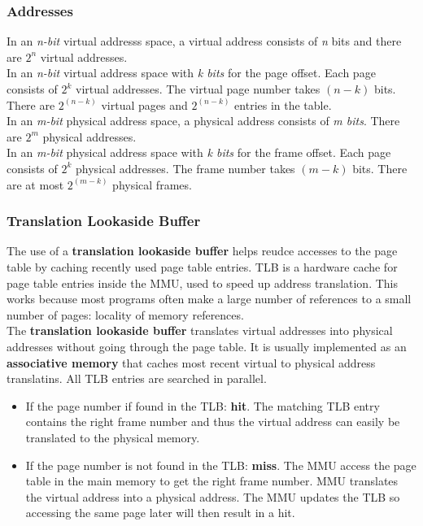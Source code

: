 \documentclass{article}
\newcommand{\bold}[1]{\textbf{#1}}
\renewcommand{\b}{\item[$\circ$]}
\newcommand{\newlist}{\begin{itemize}}
\renewcommand{\endlist}{\end{itemize}}
\begin{document}
\subsubsection{Addresses}

In an \emph{n-bit} virtual addresss space, a virtual address consists of \emph{n} bits and there are $2^n$ virtual addresses. \\ 

In an \emph{n-bit} virtual address space with \emph{k bits} for the page offset. Each page consists of $2^k$ virtual addresses. The virtual page number takes $(n-k)$ bits. There are $2^{(n-k)}$ virtual pages and $2^{(n-k)}$ entries in the table. \\ 

In an \emph{m-bit} physical address space, a physical address consists of \emph{m bits}. There are $2^m$ physical addresses. \\ 

In an \emph{m-bit} physical address space with \emph{k bits} for the frame offset. Each page consists of $2^k$ physical addresses. The frame number takes $(m-k)$ bits. There are at most $2^{(m-k)}$ physical frames. \\ 

\subsubsection{Translation Lookaside Buffer}

The use of a \bold{translation lookaside buffer} helps reudce accesses to the page table by caching recently used page table entries. TLB is a hardware cache for page table entries inside the MMU, used to speed up address translation. This works because most programs often make a large number of references to a small number of pages: locality of memory references. \\ 

The \bold{translation lookaside buffer} translates virtual addresses into physical addresses without going through the page table. It is usually implemented as an \bold{associative memory} that caches most recent virtual to physical address translatins. All TLB entries are searched in parallel. 

\newlist 
\b If the page number if found in the TLB: \bold{hit}. The matching TLB entry contains the right frame number and thus the virtual address can easily be translated to the physical memory. 
\b If the page number is not found in the TLB: \bold{miss}. The MMU access the page table in the main memory to get the right frame number. MMU translates the virtual address into a physical address. The MMU updates the TLB so accessing the same page later will then result in a hit. 
\endlist
\end{document}
